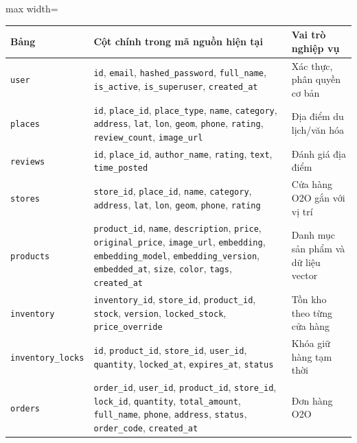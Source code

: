 \documentclass[12pt, a4paper]{article}
\begin{document}
\begin{table}[H]
\centering
\renewcommand{\arraystretch}{1.2}
\scriptsize
\begin{adjustbox}{max width=\textwidth}
\begin{tabular}{|>{\raggedright\arraybackslash}p{3.0cm}|>{\raggedright\arraybackslash}p{9.3cm}|>{\raggedright\arraybackslash}p{3.2cm}|}
\hline
\textbf{Bảng} & \textbf{Cột chính trong mã nguồn hiện tại} & \textbf{Vai trò nghiệp vụ} \\ \hline
\texttt{user} & \texttt{id}, \texttt{email}, \texttt{hashed\_password}, \texttt{full\_name}, \texttt{is\_active}, \texttt{is\_superuser}, \texttt{created\_at} & Xác thực, phân quyền cơ bản \\ \hline
\texttt{places} & \texttt{id}, \texttt{place\_id}, \texttt{place\_type}, \texttt{name}, \texttt{category}, \texttt{address}, \texttt{lat}, \texttt{lon}, \texttt{geom}, \texttt{phone}, \texttt{rating}, \texttt{review\_count}, \texttt{image\_url} & Địa điểm du lịch/văn hóa \\ \hline
\texttt{reviews} & \texttt{id}, \texttt{place\_id}, \texttt{author\_name}, \texttt{rating}, \texttt{text}, \texttt{time\_posted} & Đánh giá địa điểm \\ \hline
\texttt{stores} & \texttt{store\_id}, \texttt{place\_id}, \texttt{name}, \texttt{category}, \texttt{address}, \texttt{lat}, \texttt{lon}, \texttt{geom}, \texttt{phone}, \texttt{rating} & Cửa hàng O2O gắn với vị trí \\ \hline
\texttt{products} & \texttt{product\_id}, \texttt{name}, \texttt{description}, \texttt{price}, \texttt{original\_price}, \texttt{image\_url}, \texttt{embedding}, \texttt{embedding\_model}, \texttt{embedding\_version}, \texttt{embedded\_at}, \texttt{size}, \texttt{color}, \texttt{tags}, \texttt{created\_at} & Danh mục sản phẩm và dữ liệu vector \\ \hline
\texttt{inventory} & \texttt{inventory\_id}, \texttt{store\_id}, \texttt{product\_id}, \texttt{stock}, \texttt{version}, \texttt{locked\_stock}, \texttt{price\_override} & Tồn kho theo từng cửa hàng \\ \hline
\texttt{inventory\_locks} & \texttt{id}, \texttt{product\_id}, \texttt{store\_id}, \texttt{user\_id}, \texttt{quantity}, \texttt{locked\_at}, \texttt{expires\_at}, \texttt{status} & Khóa giữ hàng tạm thời \\ \hline
\texttt{orders} & \texttt{order\_id}, \texttt{user\_id}, \texttt{product\_id}, \texttt{store\_id}, \texttt{lock\_id}, \texttt{quantity}, \texttt{total\_amount}, \texttt{full\_name}, \texttt{phone}, \texttt{address}, \texttt{status}, \texttt{order\_code}, \texttt{created\_at} & Đơn hàng O2O \\ \hline

\end{tabular}
\end{adjustbox}
\end{table}
\end{document}
